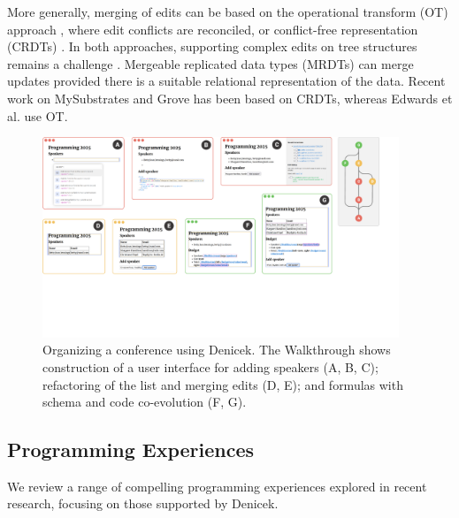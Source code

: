 \documentclass[sigconf,anonymous,screen]{acmart}
\begin{document}
More generally, merging of edits can be based on the operational transform (OT) approach
\cite{davis-2002-otsgml}, where edit conflicts are reconciled,
or conflict-free representation (CRDTs) \cite{shapiro-2011-crdts,kleppmann-2019-local,litt-2022-peritext}.
In both approaches, supporting complex edits on tree structures
remains a challenge \cite{jungnickel-2016-otjson,da-2024-jsoncrdt}. Mergeable replicated data
types (MRDTs) \cite{kaki-2019-mrdts} can merge updates provided there is a suitable relational
representation of the data. Recent work on MySubstrates and Grove \cite{adams-2025-grove,klokmose-2024-mywebstrates}
has been based on CRDTs, whereas Edwards et al. \cite{edwards-2021-typed} use OT.


\begin{figure}[t]
\includegraphics[width=0.95\textwidth,clip,trim=0cm 6cm 1.7cm 0cm]{fig/walkthrough.pdf}
\caption{Organizing a conference using Denicek. The Walkthrough shows construction of a user
  interface for adding speakers (A, B, C); refactoring of the list and merging edits (D, E); and
  formulas with schema and code co-evolution (F, G).}
\label{fig:walkthrough}
\end{figure}


\subsection{Programming Experiences}
\label{sec:background-exp}

We review a range of compelling programming experiences explored in recent research,
focusing on those supported by Denicek.
\end{document}

